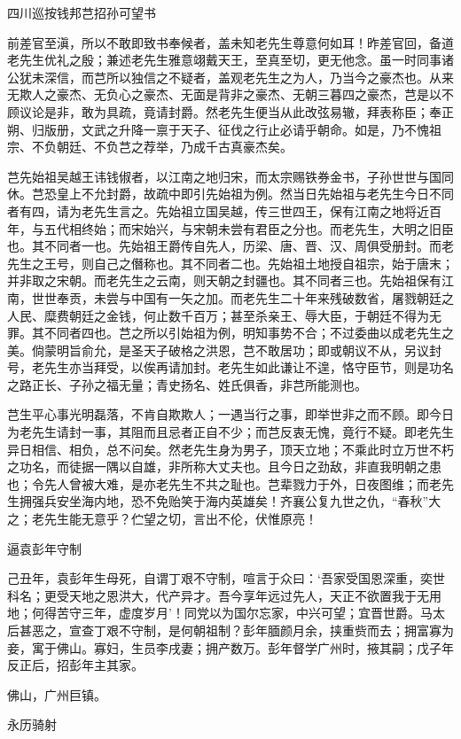 \documentclass[]{article}
\begin{document}
四川巡按钱邦芑招孙可望书

前差官至滇，所以不敢即致书奉候者，盖未知老先生尊意何如耳！昨差官回，备道老先生优礼之殷；兼述老先生雅意翊戴天王，至真至切，更无他念。虽一时同事诸公犹未深信，而芑所以独信之不疑者，盖观老先生之为人，乃当今之豪杰也。从来无欺人之豪杰、无负心之豪杰、无面是背非之豪杰、无朝三暮四之豪杰，芑是以不顾议论是非，敢为具疏，竟请封爵。然老先生便当从此改弦易辙，拜表称臣；奉正朔、归版册，文武之升降一禀于天子、征伐之行止必请乎朝命。如是，乃不愧祖宗、不负朝廷、不负芑之荐举，乃成千古真豪杰矣。

芑先始祖吴越王讳钱俶者，以江南之地归宋，而太宗赐铁券金书，子孙世世与国同休。芑恐皇上不允封爵，故疏中即引先始祖为例。然当日先始祖与老先生今日不同者有四，请为老先生言之。先始祖立国吴越，传三世四王，保有江南之地将近百年，与五代相终始；而宋始兴，与宋朝未尝有君臣之分也。而老先生，大明之旧臣也。其不同者一也。先始祖王爵传自先人，历梁、唐、晋、汉、周俱受册封。而老先生之王号，则自己之僭称也。其不同者二也。先始祖土地授自祖宗，始于唐末；并非取之宋朝。而老先生之云南，则天朝之封疆也。其不同者三也。先始祖保有江南，世世奉贡，未尝与中国有一矢之加。而老先生二十年来残破数省，屠戮朝廷之人民、糜费朝廷之金钱，何止数千百万；甚至杀亲王、辱大臣，于朝廷不得为无罪。其不同者四也。芑之所以引始祖为例，明知事势不合；不过委曲以成老先生之美。倘蒙明旨俞允，是圣天子破格之洪恩，芑不敢居功；即或朝议不从，另议封号，老先生亦当拜受，以俟再请加封。老先生如此谦让不遑，恪守臣节，则是功名之路正长、子孙之福无量；青史扬名、姓氏俱香，非芑所能测也。

芑生平心事光明磊落，不肯自欺欺人；一遇当行之事，即举世非之而不顾。即今日为老先生请封一事，其阻而且忌者正自不少；而芑反衷无愧，竟行不疑。即老先生异日相信、相负，总不问矣。然老先生身为男子，顶天立地；不乘此时立万世不朽之功名，而徒据一隅以自雄，非所称大丈夫也。且今日之劲敌，非直我明朝之患也；令先人曾被大难，是亦老先生不共之耻也。芑辈戮力于外，日夜图维；而老先生拥强兵安坐海内地，恐不免贻笑于海内英雄矣！齐襄公复九世之仇，``春秋''大之；老先生能无意乎？伫望之切，言出不伦，伏惟原亮！

逼袁彭年守制

己丑年，袁彭年生母死，自谓丁艰不守制，喧言于众曰：`吾家受国恩深重，奕世科名；更受天地之恩洪大，代产异才。吾今享年远过先人，天正不欲置我于无用地；何得苦守三年，虚度岁月'！同党以为国尔忘家，中兴可望；宜晋世爵。马太后甚恶之，宣查丁艰不守制，是何朝祖制？彭年腼颜月余，挟重赀而去；拥富寡为妾，寓于佛山。寡妇，生员李戌妻；拥产数万。彭年督学广州时，掖其嗣；戊子年反正后，招彭年主其家。

佛山，广州巨镇。

永历骑射
\end{document}
